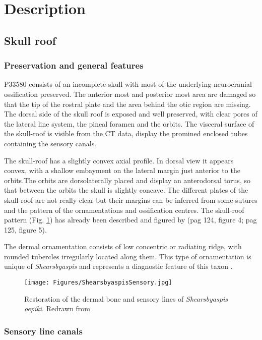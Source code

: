\documentclass[12pt,letterpaper]{article}
\begin{document}
\section{Description}
\subsection {Skull roof}
\subsubsection {Preservation and general features}

P33580 consists of an incomplete skull with most of the underlying neurocranial ossification preserved. The anterior most and posterior most area are damaged so that the tip of the rostral plate and the area behind the otic region are missing. The dorsal side of the skull roof is exposed and well preserved, with clear pores of the lateral line system, the pineal foramen and the orbits. The visceral surface of the skull-roof is visible from the CT data, display the promined enclosed tubes containing the sensory canals. 

The skull-roof has a slightly convex axial profile. In dorsal view it appears convex, with a shallow embayment on the lateral margin just anterior to the orbits.The orbits are dorsolaterally placed and display an anterodorsal torus, so that between the orbits the skull is slightly concave. The different plates of the skull-roof are not really clear but their margins can be inferred from some sutures and the pattern of the ornamentations and ossification centres. The skull-roof pattern (Fig. \ref{sensorydrawing}) has already been described and figured by \cite{Young1985} (pag 124, figure 4; pag 125, figure 5). 

The dermal ornamentation consists of low concentric or radiating ridge, with rounded tubercles irregularly located along them. This type of ornamentation is unique of \textit{Shearsbyaspis} and represents a diagnostic feature of this taxon \citep{Young1985}.

\begin{figure}[!h]
\centering
    \texttt{[image: Figures/ShearsbyaspisSensory.jpg]}
\caption{\footnotesize{Restoration of the dermal bone and sensory lines of \textit{Shearsbyaspis oepiki}. Redrawn from \citealt{Young1985}}}
\label{sensorydrawing}
\end{figure}

\subsubsection{Sensory line canals}
\end{document}
